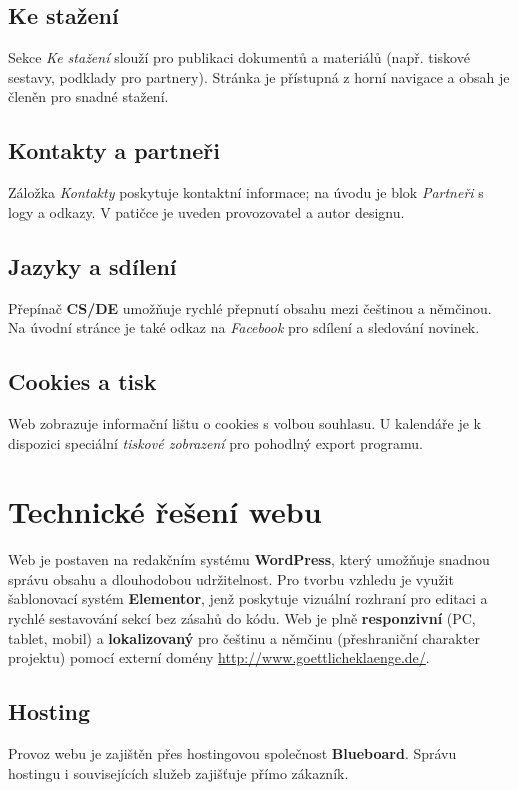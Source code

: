 \documentclass[12pt,a4paper]{article}
\begin{document}
	\subsection{Ke stažení}
	Sekce \emph{Ke stažení} slouží pro publikaci dokumentů a materiálů (např. tiskové
	sestavy, podklady pro partnery). Stránka je přístupná z horní navigace a obsah
	je členěn pro snadné stažení.
	
	\subsection{Kontakty a partneři}
	Záložka \emph{Kontakty} poskytuje kontaktní informace; na úvodu je blok
	\emph{Partneři} s logy a odkazy. V patičce je uveden provozovatel a autor designu.
	
	\subsection{Jazyky a sdílení}
	Přepínač \textbf{CS/DE} umožňuje rychlé přepnutí obsahu mezi češtinou a němčinou.
	Na úvodní stránce je také odkaz na \emph{Facebook} pro sdílení a sledování novinek.
	
	\subsection{Cookies a tisk}
	Web zobrazuje informační lištu o cookies s volbou souhlasu.
	U kalendáře je k dispozici speciální \emph{tiskové zobrazení} pro pohodlný export programu.
	
	\newpage
	\section{Technické řešení webu}
	Web je postaven na redakčním systému \textbf{WordPress}, který umožňuje snadnou
	správu obsahu a dlouhodobou udržitelnost. Pro tvorbu vzhledu je využit
	šablonovací systém \textbf{Elementor}, jenž poskytuje vizuální rozhraní pro editaci
	a rychlé sestavování sekcí bez zásahů do kódu. Web je plně \textbf{responzivní}
	(PC, tablet, mobil) a \textbf{lokalizovaný} pro češtinu a němčinu
	(přeshraniční charakter projektu) pomocí externí domény \url{http://www.goettlicheklaenge.de/}.
	\subsection{Hosting}
	Provoz webu je zajištěn přes hostingovou společnost \textbf{Blueboard}.
	Správu hostingu i souvisejících služeb zajišťuje přímo zákazník.
	
\end{document}
